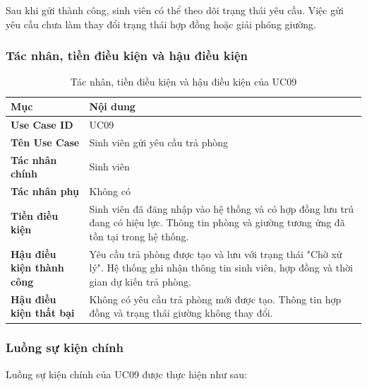 Sau khi gửi thành công, sinh viên có thể theo dõi trạng thái yêu cầu. Việc gửi yêu cầu chưa làm thay đổi trạng thái hợp đồng hoặc giải phóng giường.

\subsubsection{Tác nhân, tiền điều kiện và hậu điều kiện}

\begin{table}[H]
\centering
\small
\caption{Tác nhân, tiền điều kiện và hậu điều kiện của UC09}
\label{tab:ch2-11}
\begin{tabularx}{\textwidth}{|>{\raggedright\arraybackslash}p{}|>{\raggedright\arraybackslash}X|}
\hline
\textbf{Mục} & \textbf{Nội dung} \\
\hline
\textbf{Use Case ID} & UC09 \\
\hline
\textbf{Tên Use Case} & Sinh viên gửi yêu cầu trả phòng \\
\hline
\textbf{Tác nhân chính} & Sinh viên \\
\hline
\textbf{Tác nhân phụ} & Không có \\
\hline
\textbf{Tiền điều kiện} & Sinh viên đã đăng nhập vào hệ thống và có hợp đồng lưu trú đang có hiệu lực. Thông tin phòng và giường tương ứng đã tồn tại trong hệ thống. \\
\hline
\textbf{Hậu điều kiện thành công} & Yêu cầu trả phòng được tạo và lưu với trạng thái "Chờ xử lý". Hệ thống ghi nhận thông tin sinh viên, hợp đồng và thời gian dự kiến trả phòng. \\
\hline
\textbf{Hậu điều kiện thất bại} & Không có yêu cầu trả phòng mới được tạo. Thông tin hợp đồng và trạng thái giường không thay đổi. \\
\hline
\end{tabularx}
\end{table}

\subsubsection{Luồng sự kiện chính}

Luồng sự kiện chính của UC09 được thực hiện như sau:

